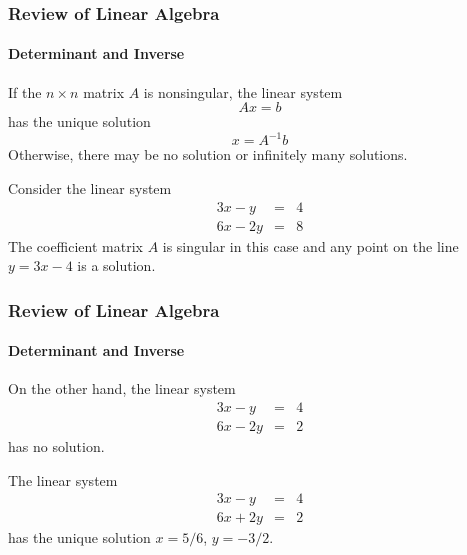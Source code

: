 \begin{frame}
\frametitle{Review of Linear Algebra}
\framesubtitle{Determinant and Inverse}
If the $n \times n$ matrix $A$ is nonsingular, the linear system
$$
Ax=b
$$
has the unique solution
$$
x = A^{-1}b
$$
Otherwise, there may be no solution or infinitely many solutions.
\begin{examp}
Consider the linear system
\begin{eqnarray*}
3x - y &=& 4 \\
6x -2y &=& 8
\end{eqnarray*}
The coefficient matrix $A$ is singular in this case and any point on the line $y=3x-4$ is
a solution.
\end{examp}
\end{frame}
\begin{frame}
\frametitle{Review of Linear Algebra}
\framesubtitle{Determinant and Inverse}
\begin{examp}
On the other hand, the linear system
\begin{eqnarray*}
3x - y &=& 4 \\
6x -2y &=& 2
\end{eqnarray*}
has no solution.
\end{examp}
\begin{examp}
The linear system
\begin{eqnarray*}
3x - y &=& 4 \\
6x +2y &=& 2
\end{eqnarray*}
has the unique solution $x=5/6$, $y=-3/2$.
\end{examp}
\end{frame}
